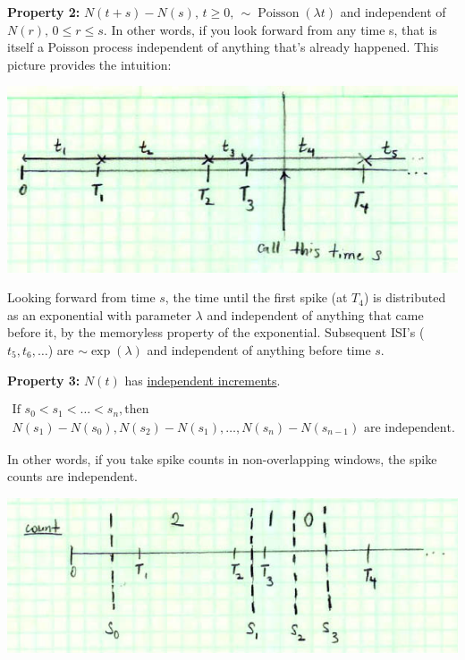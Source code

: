 \documentclass[11pt]{article}
\DeclareMathOperator{\Poisson}{Poisson}
\newenvironment{propertybox}{%
   \def\FrameCommand{\colorbox{LightSteelBlue}}%
   \MakeFramed{\advance\hsize-\width \FrameRestore}}
 {\endMakeFramed}
\begin{document}
\begin{propertybox}
{\bf Property 2:}
$N(t+s) - N(s), \, t\geq 0, \, \sim \Poisson(\lambda t)$ and independent of $N(r), \, 0\leq r \leq s$.
\end{propertybox}
In other words, if you look forward from any time s, that is itself a Poisson process independent of anything that's already
happened. This picture provides the intuition:

\begin{center}
\includegraphics[scale=0.5]{Figure5.jpg}
\end{center}

Looking forward from time $s$, the time until the first spike (at $T_4$) is distributed as an exponential with parameter $\lambda$
and independent of anything that came before it, by the memoryless property of the exponential. Subsequent ISI's
($t_5, t_6, \ldots$) are $\sim \exp (\lambda)$ and independent of anything before time $s$.

\begin{propertybox}
{\bf Property 3:} $N(t)$ has \underline{independent increments}.
\end{propertybox}

\begin{multline*}
\text{If } s_0 < s_1 < \ldots < s_n, \text{then} \\
N(s_1) - N(s_0), N(s_2) - N(s_1), \ldots, N(s_n) - N(s_{n-1})
\text{ are independent}.
\end{multline*}

In other words, if you take spike counts in non-overlapping windows, the spike counts are independent.

\begin{center}
\includegraphics[scale=0.5]{Figure6.jpg}
\end{center}
\end{document}
